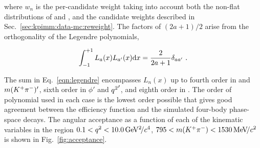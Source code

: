 \noindent where $w_{n}$ is the per-candidate weight taking into account both the non-flat distributions of \qsq and \mkpi, and the candidate weights described in Sec.~\ref{sec:kpimm:data-mc:reweight}. The factors of $(2a + 1)/2$ arise from the orthogonality of the Legendre polynomials,
 
\begin{equation}
\int_{-1}^{+1} L_{a}(x) L_{a'}(x) \mathrm{d} x = \frac{2}{2 a + 1}\delta_{ a a'}  ~.
\end{equation}

 The sum in Eq.~\ref{eqn:legendre} encompasses $L_n(x)$ up to fourth order in \ctl and $m({{K}^+}{{\pi}^-})'$, sixth order in $\phi'$ and ${q^2}'$, and eighth order in \ctk. The order of polynomial used in each case is the lowest order possible that gives good agreement between the efficiency function and the simulated four-body \BdToKpimm phase-space decays. The angular acceptance as a function of each of the kinematic variables in the region $0.1<{q^2}<10.0{\mathrm{\,Ge\kern -0.1em V^2\!/}c^4}$, $795<m({{K}^+}{{\pi}^-})<1530{\mathrm{\,Me\kern -0.1em V\!/}c^2}$ is shown in Fig.~\ref{fig:acceptance}.

